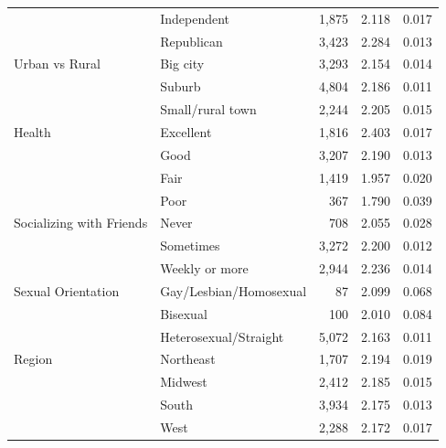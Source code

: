 \begin{table}[htbp]
\begin{tabular}{llrrr}
 & Independent & 1,875 & 2.118 & 0.017 \\
 & Republican & 3,423 & 2.284 & 0.013 \\
\midrule
Urban vs Rural & Big city & 3,293 & 2.154 & 0.014 \\
 & Suburb & 4,804 & 2.186 & 0.011 \\
 & Small/rural town & 2,244 & 2.205 & 0.015 \\
\midrule
Health & Excellent & 1,816 & 2.403 & 0.017 \\
 & Good & 3,207 & 2.190 & 0.013 \\
 & Fair & 1,419 & 1.957 & 0.020 \\
 & Poor & 367 & 1.790 & 0.039 \\
\midrule
Socializing with Friends & Never & 708 & 2.055 & 0.028 \\
 & Sometimes & 3,272 & 2.200 & 0.012 \\
 & Weekly or more & 2,944 & 2.236 & 0.014 \\
\midrule
Sexual Orientation & Gay/Lesbian/Homosexual & 87 & 2.099 & 0.068 \\
 & Bisexual & 100 & 2.010 & 0.084 \\
 & Heterosexual/Straight & 5,072 & 2.163 & 0.011 \\
\midrule
Region & Northeast & 1,707 & 2.194 & 0.019 \\
 & Midwest & 2,412 & 2.185 & 0.015 \\
 & South & 3,934 & 2.175 & 0.013 \\
 & West & 2,288 & 2.172 & 0.017 \\
\bottomrule
\end{tabular}
\end{table}
